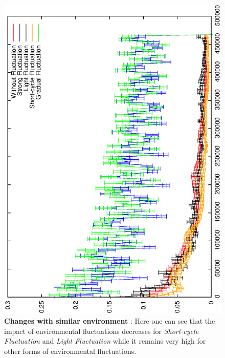 \documentclass[letterpaper]{article}
\begin{document}
\begin{figure}[h]
\centering
\includegraphics[width=0.7\columnwidth, angle =-90 ]{ProgressProp}
\caption{\textbf{Changes with similar environment} : Here one can see that the impact of environmental fluctuations decreases for \emph{Short-cycle  Fluctuation} and  \emph{Light  Fluctuation}  while it remains very high for other forms of environmental fluctuations.
}
\label{Mutations}
\end{figure}
\end{document}
